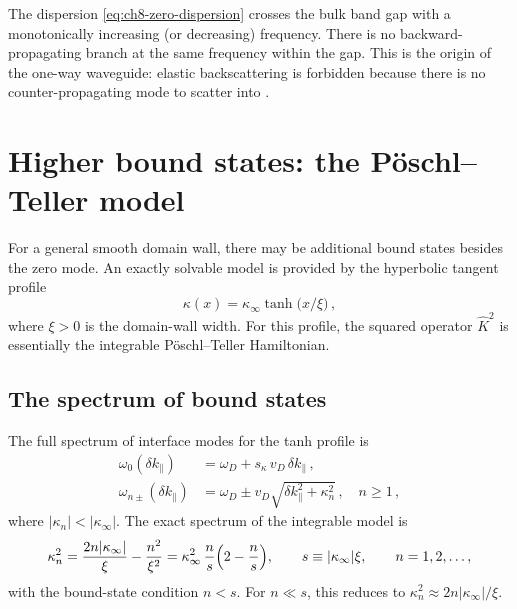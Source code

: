 \begin{remark}[Unidirectionality]
  The dispersion \eqref{eq:ch8-zero-dispersion} crosses the bulk band
  gap with a monotonically increasing (or decreasing) frequency.  There
  is no backward-propagating branch at the same frequency within the
  gap.  This is the origin of the one-way waveguide: elastic
  backscattering is forbidden because there is no counter-propagating
  mode to scatter into
\cite{he2016photonic}.
\end{remark}

\section{Higher bound states: the P\"oschl--Teller model}
\label{sec:ch8-poschl-teller}

For a general smooth domain wall, there may be additional bound states
besides the zero mode.  An exactly solvable model is provided by the
hyperbolic tangent profile
\begin{equation}\label{eq:ch8-tanh-profile}
  \kappa(x) = \kappa_\infty\tanh\bigl(x/\xi\bigr)\,,
\end{equation}
where $\xi>0$ is the domain-wall width.  For this profile, the squared
operator $\hat{K}^2$ is essentially the integrable P\"oschl--Teller
Hamiltonian.

\subsection{The spectrum of bound states}
\label{sec:ch8-pt-spectrum}

The full spectrum of interface modes for the tanh profile is
\begin{subequations}\label{eq:ch8-pt-modes}
\begin{align}
  \omega_0(\delta k_\parallel)
  &= \omega_D + s_\kappa\,v_D\,\delta k_\parallel\,,
  \label{eq:ch8-pt-zero}\\
  \omega_{n\pm}(\delta k_\parallel)
  &= \omega_D \pm v_D\sqrt{\delta k_\parallel^2 + \kappa_n^2}\,,
  \quad n\geq 1\,,
  \label{eq:ch8-pt-higher}
\end{align}
\end{subequations}
where $|\kappa_n|<|\kappa_\infty|$.  The exact spectrum of the
integrable model is
\begin{equation}\label{eq:ch8-pt-kappa-exact}
  \kappa_n^2
  = \frac{2n|\kappa_\infty|}{\xi}-\frac{n^2}{\xi^2}
  = \kappa_\infty^2\,\frac{n}{s}\Bigl(2-\frac{n}{s}\Bigr),
  \qquad s\equiv |\kappa_\infty|\xi,
  \qquad n=1,2,\ldots,
\end{equation}
with the bound-state condition $n<s$.  For $n\ll s$, this reduces to
$\kappa_n^2\approx 2n|\kappa_\infty|/\xi$.

